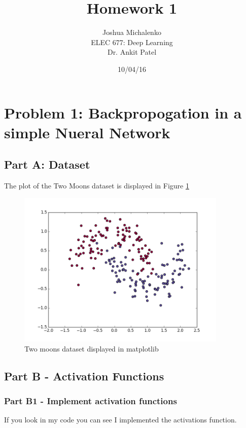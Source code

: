 \documentclass[]{article}
\begin{document}
\title{Homework 1}
\author{Joshua Michalenko\\ ELEC 677: Deep Learning \\  Dr. Ankit Patel}
\date{10/04/16}
\maketitle



\section{Problem 1: Backpropogation in a simple Nueral Network}
\subsection{Part A:  Dataset}
The plot of the Two Moons dataset is displayed in Figure \ref{fig:partA}

\begin{figure}[ht]
        \centering
        \includegraphics[width=10cm]{figures/twoMoons.png}

 	\caption{Two moons dataset displayed in matplotlib}

 	 \label{fig:partA}
\end{figure}


\subsection{Part B - Activation Functions}
\subsubsection{Part B1 - Implement activation functions}
If you look in my code you can see I implemented the activations function. 
\end{document}
